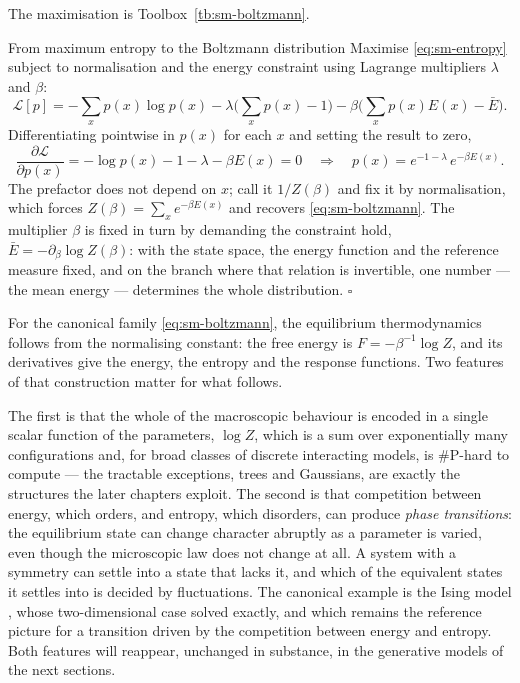 \noindent The maximisation is Toolbox~\ref{tb:sm-boltzmann}.

\begin{toolbox}[tb:sm-boltzmann]{From maximum entropy to the Boltzmann distribution}
Maximise \eqref{eq:sm-entropy} subject to normalisation and the energy
constraint using Lagrange multipliers $\lambda$ and $\beta$:
\[
  \mathcal{L}[p] = -\sum_x p(x)\log p(x)
  - \lambda\Big(\sum_x p(x) - 1\Big)
  - \beta\Big(\sum_x p(x) E(x) - \bar E\Big).
\]
Differentiating pointwise in $p(x)$ for each $x$ and setting the result to
zero,
\[
  \frac{\partial \mathcal L}{\partial p(x)} = -\log p(x) - 1 - \lambda - \beta E(x) = 0
  \quad\Longrightarrow\quad
  p(x) = e^{-1-\lambda}\, e^{-\beta E(x)}.
\]
The prefactor does not depend on $x$; call it $1/Z(\beta)$ and fix it by
normalisation, which forces $Z(\beta) = \sum_x e^{-\beta E(x)}$ and recovers
\eqref{eq:sm-boltzmann}. The multiplier $\beta$ is fixed in turn by demanding
the constraint hold, $\bar E = -\partial_\beta \log Z(\beta)$: with the state
space, the energy function and the reference measure fixed, and on the branch
where that relation is invertible, one number --- the mean energy ---
determines the whole distribution. \hfill$\square$
\end{toolbox}

For the canonical family \eqref{eq:sm-boltzmann}, the equilibrium
thermodynamics follows from the normalising constant: the free energy
is $F = -\beta^{-1}\log Z$, and its derivatives give the energy, the entropy and
the response functions. Two features of that construction matter for what
follows.

The first is that the whole of the macroscopic behaviour
is encoded in a single scalar function of the parameters, $\log Z$, which is a
sum over exponentially many configurations and, for broad classes of discrete
interacting models, is $\#\text{P}$-hard to compute \citep{barahona1982computational,jerrum1993polynomial} --- the tractable
exceptions, trees and Gaussians, are exactly the structures the later chapters
exploit.
The second is that competition between energy, which orders, and entropy, which
disorders, can produce \emph{phase transitions}: the equilibrium state can
change character abruptly as a parameter is varied, even though the microscopic
law does not change at all. A system with a symmetry can settle into a state
that lacks it, and which of the equivalent states it settles into is decided by
fluctuations. The canonical example is the Ising model \citep{ising1925beitrag},
whose two-dimensional case \citet{onsager1944crystal} solved exactly, and which
remains the reference picture for a transition driven by the competition between
energy and entropy. Both features will reappear, unchanged in substance, in the
generative models of the next sections.

